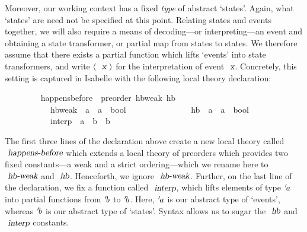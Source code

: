 \documentclass[acmlarge,review,anonymous]{acmart}\settopmatter{printfolios=true}
\begin{document}
Moreover, our working context has a fixed \emph{type} of abstract `states'.
Again, what `states' are need not be specified at this point.
Relating states and events together, we will also require a means of decoding---or interpreting---an event and obtaining a state transformer, or partial map from states to states.
We therefore assume that there exists a partial function which lifts `events' into state transformers, and write $\langle\ \isa{x}\ \rangle$ for the interpretation of event $\isa{x}$.
Concretely, this setting is captured in Isabelle with the following local theory declaration:
\\
\begin{isabellebody}
\ \ \ \ \ \ \ \  happens{\isacharunderscore}before\ {\isacharequal}\ preorder\ hb{\isacharunderscore}weak\ hb\isanewline
\ \ \ \ \ \ \ \ \ \ \ hb{\isacharunderscore}weak\ {\isacharcolon}{\isacharcolon}\ {\isachardoublequoteopen}{\isacharprime}a\ {\isasymRightarrow}\ {\isacharprime}a\ {\isasymRightarrow}\ bool{\isachardoublequoteclose}\ \ {\isacharparenleft}\ {\isachardoublequoteopen}{\isasympreceq}{\isachardoublequoteclose}\ {}{}{\isacharparenright}\isanewline
\ \ \ \ \ \ \ \ \ \ \ hb\ {\isacharcolon}{\isacharcolon}\ {\isachardoublequoteopen}{\isacharprime}a\ {\isasymRightarrow}\ {\isacharprime}a\ {\isasymRightarrow}\ bool{\isachardoublequoteclose}\ \ \ \ \ \ \ {\isacharparenleft}\ {\isachardoublequoteopen}{\isasymprec}{\isachardoublequoteclose}\ {}{}{\isacharparenright}\ {\isacharplus}\isanewline
\ \ \ \ \ \ \ \ \ \ \ interp\ {\isacharcolon}{\isacharcolon}\ {\isachardoublequoteopen}{\isacharprime}a\ {\isasymRightarrow}\ {\isacharprime}b\ {\isasymrightharpoonup}\ {\isacharprime}b{\isachardoublequoteclose}\ {\isacharparenleft}{\isachardoublequoteopen}{\isasymlangle}{\isacharunderscore}{\isasymrangle}{\isachardoublequoteclose}\ {\isacharbrackleft}{}{\isacharbrackright}\ {}{}{}{}{\isacharparenright}
\end{isabellebody}
\vspace{\baselineskip}
The first three lines of the declaration above create a new local theory called $\isa{happens-before}$ which extends a local theory of preorders which provides two fixed constants---a weak and a strict ordering---which we rename here to $\isa{hb-weak}$ and $\isa{hb}$.
Henceforth, we ignore $\isa{hb-weak}$.
Further, on the last line of the declaration, we fix a function called $\isa{interp}$, which lifts elements of type ${\emph{$\mskip2mu{'}\mskip-2mu$}}a$ into partial functions from ${\emph{$\mskip2mu{'}\mskip-2mu$}}b$ to ${\emph{$\mskip2mu{'}\mskip-2mu$}}b$.
Here, ${\emph{$\mskip2mu{'}\mskip-2mu$}}a$ is our abstract type of `events', whereas ${\emph{$\mskip2mu{'}\mskip-2mu$}}b$ is our abstract type of `states'.
Syntax allows us to sugar the $\isa{hb}$ and $\isa{interp}$ constants.
\end{document}
